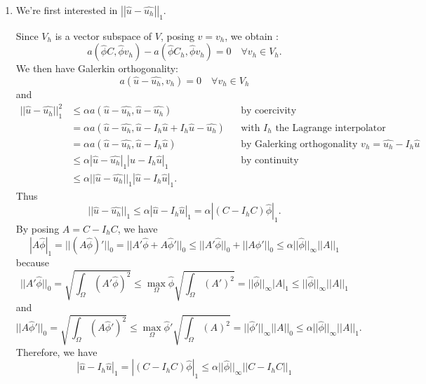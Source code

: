 \begin{enumerate}[label=\textbullet]
	\item  We're first interested in $\left|\left|\hat{u}-\hat{u_h}\right|\right|_1$.
	
	Since  $V_h$ is a vector subspace of  $V$, posing $v=v_h$, we obtain :
	\begin{equation*}
		a(\hat{\phi}C,\hat{\phi}v_h)-a(\hat{\phi}C_h,\hat{\phi}v_h)=0 \quad \forall v_h\in V_h.
	\end{equation*}
	We then have Galerkin orthogonality:
	\begin{equation*}
		a(\hat{u}-\hat{u_h},v_h)=0 \quad \forall v_h\in V_h
	\end{equation*}
	and
	\begin{align*}
		||\hat{u}-\hat{u_h}||_1^2&\le\alpha a(\hat{u}-\hat{u_h},\hat{u}-\hat{u_h}) &&\text{by coercivity} \\
		&=\alpha a(\hat{u}-\hat{u_h},\hat{u}-I_h\hat{u}+I_h\hat{u}-\hat{u_h}) &&\text{with $I_h$ the Lagrange interpolator}\\
		&=\alpha a(\hat{u}-\hat{u_h},\hat{u}-I_h\hat{u}) &&\text{by Galerking orthogonality taking } v_h=\hat{u_h}-I_h\hat{u} \\
		&\le\alpha |\hat{u}-\hat{u_h}|_1|\hat{u}-I_h\hat{u}|_1 &&\text{by continuity} \\
		&\le\alpha ||\hat{u}-\hat{u_h}||_1|\hat{u}-I_h\hat{u}|_1.
	\end{align*}
	Thus
	\begin{equation*}
		||\hat{u}-\hat{u_h}||_1\le\alpha|\hat{u}-I_h\hat{u}|_1=\alpha|(C-I_hC)\hat{\phi}|_1.
	\end{equation*}
	By posing $A=C-I_hC$, we have
	\begin{equation*}
		|A\hat{\phi}|_1=||(A\hat{\phi})'||_0=||A'\hat{\phi}+A\hat{\phi}'||_0\le||A'\hat{\phi}||_0+||A\hat{\phi}'||_0\le\alpha ||\hat{\phi}||_\infty||A||_1
	\end{equation*}
	because
	\begin{equation*}
		||A'\hat{\phi}||_0=\sqrt{\int_\Omega(A'\hat{\phi})^2}\le \max_\Omega \hat{\phi}\sqrt{\int_\Omega(A')^2}=||\hat{\phi}||_\infty|A|_1\le||\hat{\phi}||_\infty||A||_1
	\end{equation*}
	and
	\begin{equation*}
		||A\hat{\phi}'||_0=\sqrt{\int_\Omega(A\hat{\phi}')^2}\le \max_\Omega \hat{\phi}'\sqrt{\int_\Omega(A)^2}=||\hat{\phi}'||_\infty||A||_0\le \alpha||\hat{\phi}||_\infty||A||_1.
	\end{equation*}
	Therefore, we have
	\begin{equation*}
		|\hat{u}-I_h\hat{u}|_1=|(C-I_hC)\hat{\phi}|_1\le\alpha ||\hat{\phi}||_\infty||C-I_hC||_1
	\end{equation*}
	

\end{enumerate}
